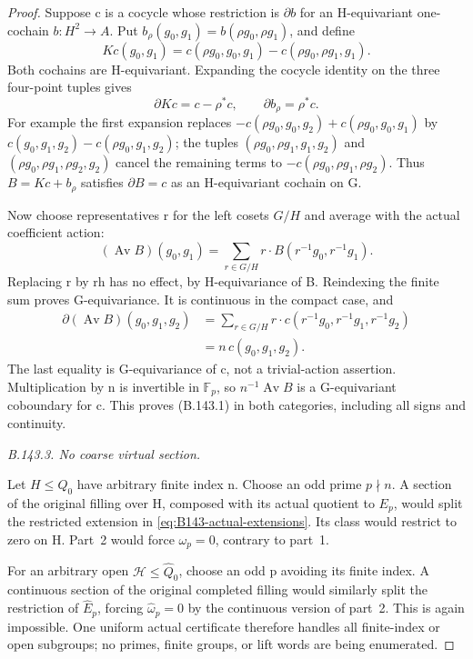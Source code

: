 \begin{proof}
Suppose c is a cocycle whose restriction is \(\partial b\)
for an H-equivariant one-cochain \(b:H^2\to A\).
Put \(b_\rho(g_0,g_1)=b(\rho g_0,\rho g_1)\), and define
\[
 Kc(g_0,g_1)
   =c(\rho g_0,g_0,g_1)-c(\rho g_0,\rho g_1,g_1).
 \tag{B.143.2}
\]
Both cochains are H-equivariant. Expanding the cocycle
identity on the three four-point tuples gives
\[
       \partial Kc=c-\rho^*c,\qquad
       \partial b_\rho=\rho^*c.
 \tag{B.143.3}
\]
For example the first expansion replaces
\(-c(\rho g_0,g_0,g_2)+c(\rho g_0,g_0,g_1)\)
by \(c(g_0,g_1,g_2)-c(\rho g_0,g_1,g_2)\);
the tuples \((\rho g_0,\rho g_1,g_1,g_2)\) and
\((\rho g_0,\rho g_1,\rho g_2,g_2)\) cancel the remaining
terms to \(-c(\rho g_0,\rho g_1,\rho g_2)\).
Thus \(B=Kc+b_\rho\) satisfies \(\partial B=c\)
as an H-equivariant cochain on G.

Now choose representatives r for the left cosets \(G/H\)
and average with the actual coefficient action:
\[
 (\operatorname{Av}B)(g_0,g_1)
   =\sum_{r\in G/H}r\cdot
          B(r^{-1}g_0,r^{-1}g_1).
 \tag{B.143.4}
\]
Replacing r by rh has no effect, by H-equivariance of B.
Reindexing the finite sum proves G-equivariance. It is
continuous in the compact case, and
\[
 \begin{aligned}
 \partial(\operatorname{Av}B)(g_0,g_1,g_2)
   &=\sum_{r\in G/H}r\cdot
          c(r^{-1}g_0,r^{-1}g_1,r^{-1}g_2)\\
   &=n\,c(g_0,g_1,g_2).
 \end{aligned}
 \tag{B.143.5}
\]
The last equality is G-equivariance of c, not a
trivial-action assertion. Multiplication by n is invertible
in \(\mathbb F_p\), so \(n^{-1}\operatorname{Av}B\)
is a G-equivariant coboundary for c. This proves (B.143.1)
in both categories, including all signs and continuity.

\emph{B.143.3. No coarse virtual section.}\par
Let \(H\leq Q_0\) have arbitrary finite index n. Choose an
odd prime \(p\nmid n\). A section of the original filling
over H, composed with its actual quotient to \(E_p\),
would split the restricted extension in
\eqref{eq:B143-actual-extensions}. Its class would restrict
to zero on H. Part~2 would force \(\omega_p=0\),
contrary to part~1.

For an arbitrary open \(\mathcal H\leq\widehat Q_0\),
choose an odd p avoiding its finite index. A continuous
section of the original completed filling would similarly
split the restriction of \(\widehat E_p\), forcing
\(\widehat\omega_p=0\) by the continuous version of part~2.
This is again impossible. One uniform actual certificate
therefore handles all finite-index or open subgroups;
no primes, finite groups, or lift words are being enumerated.


\end{proof}
